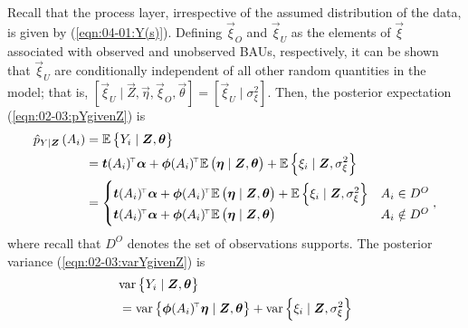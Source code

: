 \documentclass[12pt,a4paper]{article}
\begin{document}
\begin{appendices}
Recall that the process layer, irrespective of the assumed distribution of the data, is given by (\ref{eqn:04-01:Y(s)}). Defining $\vec{\xi}_O$ and $\vec{\xi}_U$ as the elements of $\vec{\xi}$ associated with observed and unobserved BAUs, respectively, it can be shown \citep[e.g.,][]{Sengupta_Cressie_2013_spatial_GLMM_FRK} that $\vec{\xi}_U$ are conditionally independent of all other random quantities in the model; that is, $[\vec{\xi}_U \mid \vec{Z}, \vec{\eta}, \vec{\xi}_O, \vec{\theta}] = [\vec{\xi}_U \mid \sigma^2_\xi]$. 
Then, the posterior expectation (\ref{eqn:02-03:pYgivenZ}) is 
\begin{align*}
    \pYgivenZ{A_i}
    &=
    \ECurly{Y_i \mid \vec{Z}, \vec{\theta}}\\
    &=
    \vec{t}(A_i)^\tp\vec{\alpha} + \vec{\phi}(A_i)^\tp \E{\vec{\eta} \mid \vec{Z}, \vec{\theta}} + \ECurly{\xi_i \mid \vec{Z}, \sigma^2_\xi}\\
    &=
    \begin{cases} 
      \vec{t}(A_i)^\tp\vec{\alpha} + \vec{\phi}(A_i)^\tp \E{\vec{\eta} \mid \vec{Z}, \vec{\theta}} + \ECurly{\xi_i \mid \vec{Z}, \sigma^2_\xi} & A_i\in D^O \\
      \vec{t}(A_i)^\tp\vec{\alpha} + \vec{\phi}(A_i)^\tp \E{\vec{\eta} \mid \vec{Z}, \vec{\theta}} & A_i\notin D^O
   \end{cases},
\end{align*}
where recall that $D^O$ denotes the set of observations supports. 
 The posterior variance (\ref{eqn:02-03:varYgivenZ}) is 
\begin{align*}
    &\varCurly{Y_i \mid \vec{Z}, \vec{\theta}} \nonumber \\
    &=
    \varCurly{\vec{\phi}(A_i)^\tp \vec{\eta} \mid \vec{Z}, \vec{\theta}}
    +
    \varCurly{\xi_i \mid \vec{Z}, \sigma^2_\xi}

\end{align*}
\end{appendices}
\end{document}
